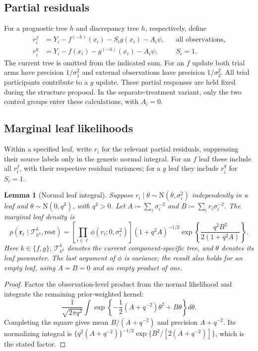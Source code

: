 \documentclass[11pt]{article}
\newcommand{\N}{\mathrm{N}}
\newtheorem{lemma}{Lemma}[section]
\theoremstyle{remark}\newtheorem{remark}{Remark}[section]
\providecommand{\DIFaddtex}[1]{{\protect\color{blue} \sf #1}} %
\providecommand{\DIFaddbegin}{} %
\providecommand{\DIFaddend}{} %
\providecommand{\DIFadd}[1]{\texorpdfstring{\DIFaddtex{#1}}{#1}} %
\begin{document}
\subsection{Partial residuals}\label{sec:A.2}
For  \DIFaddbegin \DIFadd{a prognostic tree $h$ and discrepancy tree $h$, respectively, define
}\begin{equation}\label{eq:partial}
\begin{aligned}
r_i^f&=Y_i-f^{(-h)}(x_i)-S_i g(x_i)-A_i\psi,&&\text{all observations},\\
r_i^g&=Y_i-f(x_i)-g^{(-h)}(x_i)-A_i\psi,&&S_i=1.
\end{aligned}
\end{equation}\DIFaddend 
The  \DIFaddbegin \DIFadd{current tree is omitted from the indicated sum. For an $f$ update both trial arms have precision $1/\sigma_1^2$ and external observations have precision $1/\sigma_2^2$. All trial participants contribute to a $g$ update. These partial responses are held fixed during the structure proposal. In the separate-treatment variant, only the two control groups enter these calculations, with $A_i=0$}\DIFaddend .

\subsection{Marginal leaf likelihoods}\label{sec:A.3}
Within a specified leaf, write $r_i$ for the relevant partial residuals, suppressing their source labels only in the generic normal integral. For an $f$ leaf these include  \DIFaddbegin \DIFadd{all $r_i^f$}\DIFaddend , with their respective residual variances; for a $g$ leaf they include  \DIFaddbegin \DIFadd{$r_i^g$ for $S_i=1$}\DIFaddend .
\begin{lemma}[Normal leaf integral]\label{lem:leaf}
Suppose $r_i\mid\theta\sim\N(\theta,\sigma_i^2)$ independently in a leaf and $\theta\sim\N(0,q^2)$, with $q^2>0$. Let $A\coloneqq \sum_i\sigma_i^{-2}$ and $B\coloneqq \sum_i r_i\sigma_i^{-2}$. The marginal leaf density is
\begin{equation}\label{eq:leafdensity}
p(\mathbf r_\ell\mid \mathcal T_{h^k}^k,\text{rest})=
\left[\prod_{i\in\ell}\phi(r_i;0,\sigma_i^2)\right]
(1+q^2A)^{-1/2}\exp\!\left\{\frac{q^2B^2}{2(1+q^2A)}\right\}.
\end{equation}
Here $k\in\{f,g\}$, $\mathcal T_{h^k}^k$ denotes the current component-specific tree, and $\theta$ denotes its leaf parameter. The last argument of $\phi$ is variance; the result also holds for an empty leaf, using $A=B=0$ and an empty product of one.
\end{lemma}
\begin{proof}
Factor the observation-level product from the normal likelihood and integrate the remaining prior-weighted kernel:
\begin{equation}
\frac{1}{\sqrt{2\pi q^2}}\int\exp\left\{-\frac{1}{2}(A+q^{-2})\theta^2+B\theta\right\}d\theta.
\end{equation}
Completing the square gives mean $B/(A+q^{-2})$ and precision $A+q^{-2}$. Its normalizing integral is $\{q^2(A+q^{-2})\}^{-1/2}\exp\{B^2/[2(A+q^{-2})]\}$, which is the stated factor.
\end{proof}
\end{document}
